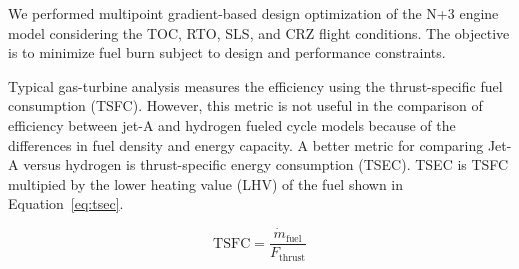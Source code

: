 \documentclass[conf]{new-aiaa}
\begin{document}
We performed multipoint gradient-based design optimization of the N+3 engine model considering the TOC, RTO, SLS, and CRZ flight conditions.
The objective is to minimize fuel burn subject to design and performance constraints.

Typical gas-turbine analysis measures the efficiency using the thrust-specific fuel consumption (TSFC).
However, this metric is not useful in the comparison of efficiency between jet-A and hydrogen fueled cycle models because of the differences in fuel density and energy capacity.
A better metric for comparing Jet-A versus hydrogen is thrust-specific energy consumption (TSEC). %
TSEC is TSFC multipied by the lower heating value (LHV) of the fuel shown in Equation~\eqref{eq:tsec}.

\begin{equation}
    \mathrm{TSFC} = \frac{\dot{m}_{\mathrm{fuel}}}{F_{\mathrm{thrust}}}
    \label{eq:tsfc}
\end{equation}
\end{document}
